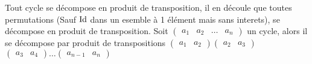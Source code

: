 \begin{theoreme}
    Tout cycle se décompose en produit de transposition, il en découle que toutes permutations (Sauf $\operatorname{Id}$ dans un esemble à 1 élément mais sans interets), se décompose en produit de transposition.
    \tcblower
    Soit $\begin{pmatrix}
        a_1 & a_2 & \dots & a_n
        \end{pmatrix}$ un cycle, alors il se décompose par produit de transpositions $\begin{pmatrix}
            a_1 & a_2
            \end{pmatrix}$$\begin{pmatrix}
                a_2 & a_3
                \end{pmatrix}$
                $\begin{pmatrix}
                    a_3 & a_4
                    \end{pmatrix}\dots$$\begin{pmatrix}
                        a_{n-1} & a_n
                        \end{pmatrix}$
\end{theoreme}
